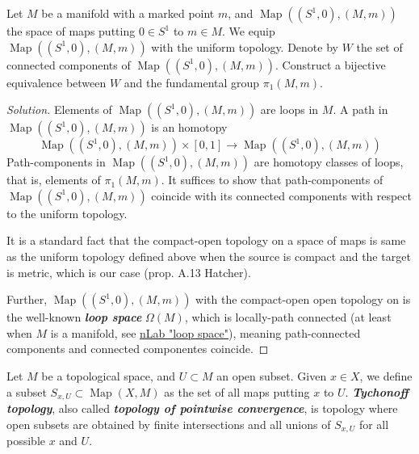 \documentclass{article}
\DeclareMathOperator{\Map}{Map}
\begin{document}
\begin{exercise}
	Let $M$ be a manifold with a marked point $m$, and $\Map((S^1, 0), (M, m))$ the space of maps putting $0 \in S^1$ to $m \in M$. We equip $\Map((S^1, 0), (M, m))$ with the uniform topology. Denote by $W$ the set of connected components of $\Map((S^1,0),(M,m))$. Construct a bijective equivalence between $W$ and the fundamental group $\pi_1(M, m)$.
\end{exercise}
\begin{proof}[Solution]
	Elements of $\Map((S^1,0),(M,m))$ are loops in $M$. A path in $\Map((S^1,0),(M,m))$ is an homotopy
	\[\Map((S^1,0),(M,m))\times [0,1]\to \Map((S^1,0),(M,m))\]
	Path-components in $\Map((S^1,0),(M,m))$ are homotopy classes of loops, that is, elements of $\pi_1(M,m)$. It suffices to show that path-components of $\Map((S^1,0),(M,m))$ coincide with its connected components with respect to the uniform topology.
	
	It is a standard fact that the compact-open topology on a space of maps is same as the uniform topology defined above when the source is compact and the target is metric, which is our case (prop. A.13 Hatcher).
	
	Further, $\Map((S^1,0),(M,m))$ with the compact-open open topology on is the well-known \textbf{\textit{loop space}} $\Omega(M)$, which is locally-path connected (at least when $M$ is a manifold, see \href{https://ncatlab.org/nlab/show/loop+space}{nLab "loop space"}), meaning path-connected components and connected componentes coincide.
\end{proof}

\begin{defn}
	Let $M$ be a topological space, and $U \subset M$ an open subset. Given $x \in X$, we define a subset $S_{x,U} \subset \Map(X,M)$ as the set of all maps putting $x$ to $U$. \textbf{\textit{Tychonoff topology}}, also called \textbf{\textit{topology of pointwise convergence}}, is topology where open subsets are obtained by finite intersections and all unions of $S_{x,U}$ for all possible $x$ and $U$.
\end{defn}
\end{document}
